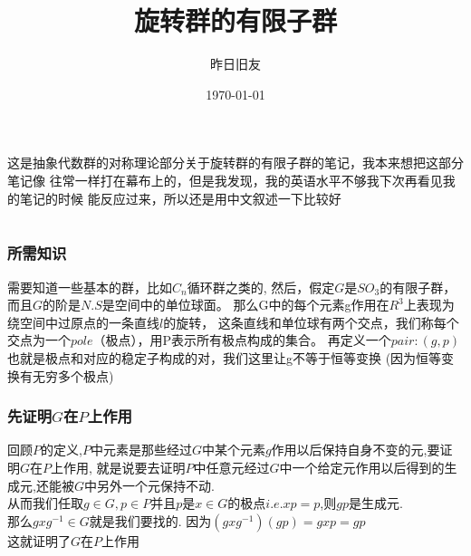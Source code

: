 \documentclass{article}
\title{旋转群的有限子群}
\author{昨日旧友}
\date{\today}
\begin{document}
\maketitle

\part{}
这是抽象代数群的对称理论部分关于旋转群的有限子群的笔记，我本来想把这部分笔记像
往常一样打在幕布上的，但是我发现，我的英语水平不够我下次再看见我的笔记的时候
能反应过来，所以还是用中文叙述一下比较好\\


\part{}
    \section{所需知识}
        需要知道一些基本的群，比如$C_n$循环群之类的,
        然后，假定$G$是$SO_3$的有限子群，而且$G$的阶是$N$.$S$是空间中的单位球面。
        那么G中的每个元素g作用在$R^3$上表现为绕空间中过原点的一条直线$l$的旋转，
        这条直线和单位球有两个交点，我们称每个交点为一个$pole$（极点），用P表示所有极点构成的集合。
        再定义一个$pair:(g,p)$也就是极点和对应的稳定子构成的对，我们这里让g不等于恒等变换
        (因为恒等变换有无穷多个极点)
    \section{先证明$G$在$P$上作用}
        回顾$P$的定义,$P$中元素是那些经过$G$中某个元素$g$作用以后保持自身不变的元,要证明$G$在$P$上作用,
        就是说要去证明$P$中任意元经过$G$中一个给定元作用以后得到的生成元,还能被$G$中另外一个元保持不动.
        \\从而我们任取$g \in G , p \in P$并且$p$是$x\in G$的极点$i.e.xp=p$,则$gp$是生成元.\\
        那么$gxg^{-1} \in G$就是我们要找的.
        因为$(gxg^{-1})(gp)=gxp=gp$\\
        这就证明了$G$在$P$上作用
\end{document}
